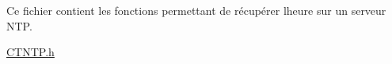 Ce fichier contient les fonctions permettant de récupérer l\textquotesingle{}heure sur un serveur NTP.

\mbox{\hyperlink{_c_t_n_t_p_8h}{CTNTP.\+h}} 